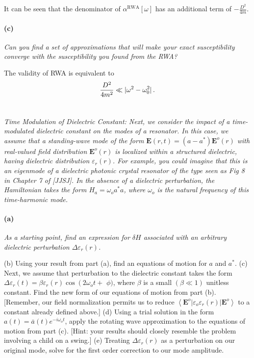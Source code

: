 \documentclass[hyperref, a4paper]{article}
\begin{document}
It can be seen that the denominator of $\alpha^{\text{RWA}}[\omega]$
has an additional term of $- \frac{D^2}{4m}$.

\paragraph*{(c)} \textit{Can you find a set of approximations that will make your exact susceptibility converge with the susceptibility you found from the RWA?} 

The validity of RWA is equivalent to 
\begin{equation}
    \frac{D^2}{4m^2} \ll \abs*{\omega^2 - \omega_0^2}. 
\end{equation} 


\section{}

\textit{Time Modulation of Dielectric Constant: Next, we consider the impact of a time-modulated dielectric constant on the modes of a resonator. In this case, we assume that a standing-wave mode of the form $\mathbf{E}(r, t)=\left(a-a^*\right) \mathbf{E}^o(r)$ with real-valued field distribution $\mathbf{E}^o(r)$ is localized within a structured dielectric, having dielectric distribution $\varepsilon_r(r)$. For example, you could imagine that this is an eigenmode of a dielectric photonic crystal resonator of the type seen as Fig 8 in Chapter 7 of [JJSJ]. In the absence of a dielectric perturbation, the Hamiltonian takes the form $H_a=\omega_o a^* a$, where $\omega_o$ is the natural frequency of this time-harmonic mode.}

\paragraph*{(a)} \textit{As a starting point, find an expression for $\delta H$ associated with an arbitrary dielectric perturbation $\Delta \varepsilon_r(r)$.} 



(b) Using your result from part (a), find an equations of motion for $a$ and $a^*$.
(c) Next, we assume that perturbation to the dielectric constant takes the form $\Delta \varepsilon_r(t)=\beta \varepsilon_r(r) \cos \left(2 \omega_o t+\right.$ $\phi)$, where $\beta$ is a small $(\beta \ll 1)$ unitless constant. Find the new form of our equations of motion from part (b). [Remember, our field normalization permits us to reduce $\left\langle\mathbf{E}^o\left|\varepsilon_o \varepsilon_r(r)\right| \mathbf{E}^o\right\rangle$ to a constant already defined above.]
(d) Using a trial solution in the form $a(t)=\bar{a}(t) e^{-i \omega_o t}$, apply the rotating wave approximation to the equations of motion from part (c). [Hint: your results should closely resemble the problem involving a child on a swing.]
(e) Treating $\Delta \varepsilon_r(r)$ as a perturbation on our original mode, solve for the first order correction to our mode amplitude.
\end{document}
